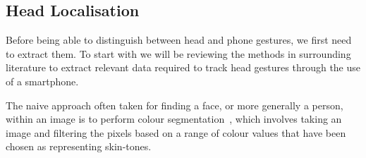 \subsection{Head Localisation}
Before being able to distinguish between head and phone gestures, we first need to extract them. 
To start with we will be reviewing the methods in surrounding literature to extract relevant data required to track head gestures through the use of a smartphone.

The naive approach often taken for finding a face, or more generally a person, within an image is to perform colour segmentation~\cite{huang2004robust,bin2007rgb,chan2004face}, which involves taking an image and filtering the pixels based on a range of colour values that have been chosen as representing skin-tones.

